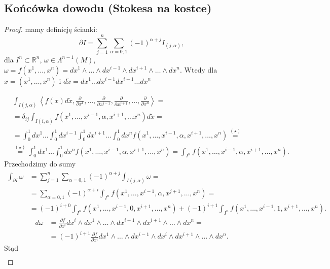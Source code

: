 \documentclass[../main.tex]{subfiles}
\begin{document}
\subsection{Końcówka dowodu (Stokesa na kostce)}
\begin{proof}

mamy definicję ścianki:
\[
    \partial I = \sum_{j = 1}^n\sum_{\alpha = 0,1}(-1)^{\alpha+j}I_{(j,\alpha)}
,\]
dla $I^n\subset\mathbb{R}^n$, $\omega\in \Lambda^{n-1}(M)$, $\omega = f(x^1, \ldots, x^n) = dx^1\land \ldots\land dx^{i-1}\land dx^{i+1}\land \ldots\land dx^n$. Wtedy dla $x = (x^1,\ldots,x^n)$ i $d\tilde x = dx^1\ldots dx^{i-1}dx^{i+1}\ldots dx^n$

\begin{align*}
    &\int_{I(j,\alpha)}\left<f(x) d\tilde x, \frac{\partial }{\partial x^1}, \ldots, \frac{\partial }{\partial x^{j-1}}, \frac{\partial }{\partial x^{j+1}}, \ldots, \frac{\partial }{\partial x^n} \right> = \\
    &= \delta_{ij} \int_{I(i,\alpha)}f(x^1,\ldots,x^{i-1},\alpha, x^{i+1}, \ldots x^n)d\tilde x =\\
    &= \int_0^1 dx^1 \ldots \int_0^1 dx^{i-1} \int_0^1 dx^{i+1} \ldots \int_0^1 dx^n f(x^1,\ldots,x^{i-1},\alpha, x^{i+1}, \ldots, x^n) \overset{(\star)}{=}\\
        &\overset{(\star)}{=} \int_0^1dx^1\ldots\int_0^1dx^n f(x^1,\ldots, x^{i-1},\alpha, x^{i+1}, \ldots, x^n) = \int_{I^n}f(x^1,\ldots,x^{i-1},\alpha, x^{i+1}, \ldots, x^n)
.\end{align*}
Przechodzimy do sumy
\begin{align*}
    \int_{\partial I}\omega &= \sum_{j=1}^{n} \sum_{\alpha = 0,1} (-1)^{\alpha+j}\int_{I(j,\alpha)}\omega =\\
    &= \sum_{\alpha = 0,1}(-1)^{\alpha + i}\int_{I^n}f(x^1,\ldots,x^{i-1},\alpha,x^{j+1},\ldots,x^n) =\\
    &= (-1)^{i+0}\int_{I^n}f(x^1,\ldots,x^{i-1}, 0, x^{i+1},\ldots,x^n) + (-1)^{i+1}\int_{I^n}f(x^1,\ldots,x^{i-1},1,x^{i+1},\ldots,x^n)
.\end{align*}
\begin{align*}
    d\omega &= \frac{\partial f}{\partial x^i} dx^i\land dx^1\land \ldots\land dx^{i-1}\land dx^{i+1}\land \ldots\land dx^n = \\
    &= (-1)^{i+1} \frac{\partial f}{\partial x^i} dx^1\land \ldots\land dx^{i-1}\land dx^i \land dx^{i+1} \land \ldots \land dx^n
.\end{align*}
Stąd
\begin{align*}

\end{align*}
\end{proof}
\end{document}
